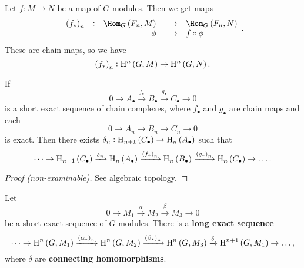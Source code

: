 \begin{corollary}
Let $ f : M \to N $ be a map of $ G $-modules. Then we get maps
$$ \function[\br{f_*}_n]{\Hom_G\br{F_n, M}}{\Hom_G\br{F_n, N}}{\phi}{f \circ \phi}. $$
These are chain maps, so we have
$$ \br{f_*}_n : \H^n\br{G, M} \to \H^n\br{G, N}. $$
\end{corollary}


\begin{lemma}
If
$$ 0 \to A_\bullet \xrightarrow{f_\bullet} B_\bullet \xrightarrow{g_\bullet} C_\bullet \to 0 $$
is a short exact sequence of chain complexes, where $ f_\bullet $ and $ g_\bullet $ are chain maps and each
$$ 0 \to A_n \to B_n \to C_n \to 0 $$
is exact. Then there exists $ \delta_n : \H_{n + 1}\br{C_\bullet} \to \H_n\br{A_\bullet} $ such that
$$ \dots \to \H_{n + 1}\br{C_\bullet} \xrightarrow{\delta_n} \H_n\br{A_\bullet} \xrightarrow{\br{f_*}_n} \H_n\br{B_\bullet} \xrightarrow{\br{g_*}_n} \H_n\br{C_\bullet} \to \dots. $$
\end{lemma}

\begin{proof}[Proof (non-examinable)]
See algebraic topology.
\end{proof}

\pagebreak

\begin{proposition}
\label{prop:5.1.28}
Let
$$ 0 \to M_1 \xrightarrow{\alpha} M_2 \xrightarrow{\beta} M_3 \to 0 $$
be a short exact sequence of $ G $-modules. There is a \textbf{long exact sequence}
$$ \dots \to \H^n\br{G, M_1} \xrightarrow{\br{\alpha_*}_n} \H^n\br{G, M_2} \xrightarrow{\br{\beta_*}_n} \H^n\br{G, M_3} \xrightarrow{\delta} \H^{n + 1}\br{G, M_1} \to \dots, $$
where $ \delta $ are \textbf{connecting homomorphisms}.
\end{proposition}

